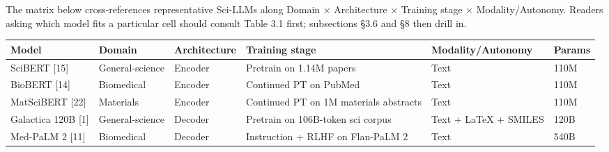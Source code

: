 The matrix below cross-references representative Sci-LLMs along Domain × Architecture × Training stage × Modality/Autonomy. Readers asking which model fits a particular cell should consult Table 3.1 first; subsections §3.6 and §8 then drill in.

{\def\LTcaptype{none} %
\begin{longtable}[]{@{}
  >{\raggedright\arraybackslash}p{}
  >{\raggedright\arraybackslash}p{}
  >{\raggedright\arraybackslash}p{}
  >{\raggedright\arraybackslash}p{}
  >{\raggedright\arraybackslash}p{}
  >{\raggedright\arraybackslash}p{}@{}}
\toprule\noalign{}
\begin{minipage}[b]{\linewidth}\raggedright
Model
\end{minipage} & \begin{minipage}[b]{\linewidth}\raggedright
Domain
\end{minipage} & \begin{minipage}[b]{\linewidth}\raggedright
Architecture
\end{minipage} & \begin{minipage}[b]{\linewidth}\raggedright
Training stage
\end{minipage} & \begin{minipage}[b]{\linewidth}\raggedright
Modality/Autonomy
\end{minipage} & \begin{minipage}[b]{\linewidth}\raggedright
Params
\end{minipage} \\
\midrule\noalign{}
\endhead
\bottomrule\noalign{}
\endlastfoot
SciBERT {[}15{]} & General-science & Encoder & Pretrain on 1.14M papers & Text & 110M \\
BioBERT {[}14{]} & Biomedical & Encoder & Continued PT on PubMed & Text & 110M \\
MatSciBERT {[}22{]} & Materials & Encoder & Continued PT on 1M materials abstracts & Text & 110M \\
Galactica 120B {[}1{]} & General-science & Decoder & Pretrain on 106B-token sci corpus & Text + LaTeX + SMILES & 120B \\
Med-PaLM 2 {[}11{]} & Biomedical & Decoder & Instruction + RLHF on Flan-PaLM 2 & Text & 540B \\

\end{longtable}}
